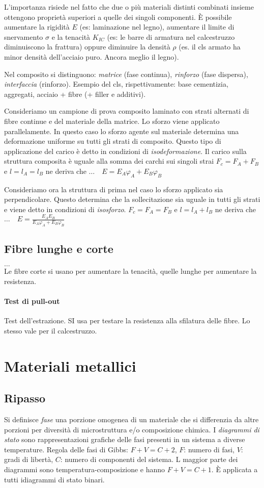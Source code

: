 \documentclass[a5paper,12pt]{article}
\newcommand{\e}{\`E\xspace}  %
\begin{document}
L'importanza risiede nel fatto che due o più materiali distinti combinati insieme ottengono proprietà superiori a quelle dei singoli componenti. \e possibile aumentare la rigidità $E$ (es: laminazione nel legno), aumentare il limite di snervamento $\sigma$ e la tenacità $K_{IC}$ (es: le barre di armatura nel calcestruzzo diminuiscono la frattura) oppure diminuire la densità $\rho$ (es. il cls armato ha minor densità dell'acciaio puro. Ancora meglio il legno).

Nel composito si distinguono: \emph{matrice} (fase continua), \emph{rinforzo} (fase dispersa), \emph{interfaccia} (rinforzo). Esempio del cls, rispettivamente: base cementizia, aggregati, acciaio + fibre (+ filler e additivi).

Consideriamo un campione di prova composito laminato con strati alternati di fibre continue e del materiale della matrice. Lo sforzo viene applicato parallelamente. In questo caso lo sforzo agente sul materiale determina una deformazione uniforme su tutti gli strati di composito. Questo tipo di applicazione del carico è detto in condizioni di \emph{isodeformazione}. Il carico sulla struttura composita è uguale alla somma dei carchi sui singoli strai $F_c = F_A + F_B$ e $l=l_A = l_B$ ne deriva che $ \dots \quad E=E_A \varphi_A + E_B \varphi_B$  

Consideriamo ora la struttura di prima nel caso lo sforzo applicato sia perpendicolare. Questo determina che la sollecitazione sia uguale in tutti gli strati e viene detto in condizioni di \emph{isosforzo}. $F_c= F_A = F_B$ e $l=l_A + l_B$ ne deriva che $ \dots \quad E=\frac{E_A E_B}{E_A \varphi_A + E_B \varphi_B}$
\subsection{Fibre lunghe e corte}
$\dots$\\
Le fibre corte si usano per aumentare la tenacità, quelle lunghe per aumentare la resistenza.
\paragraph{Test di pull-out} Test dell'estrazione. SI usa per testare la resistenza alla sfilatura delle fibre. Lo stesso vale per il calcestruzzo.
\section{Materiali metallici}
\subsection{Ripasso}
Si definisce \emph{fase} una porzione omogenea di un materiale che si differenzia da altre porzioni per diversità di microstruttura e/o composizione chimica. I \emph{diagrammi di stato} sono rappresentazioni grafiche delle fasi presenti in un sistema a diverse temperature.
Regola delle fasi di Gibbs: $F + V = C+2$, $F$: numero di fasi, $V$: gradi di libertà, $C$: numero di componenti del sistema. L maggior parte dei diagrammi sono temperatura-composizione e hanno $F + V = C+1$. \e applicata a tutti idiagrammi di stato binari.
\end{document}
